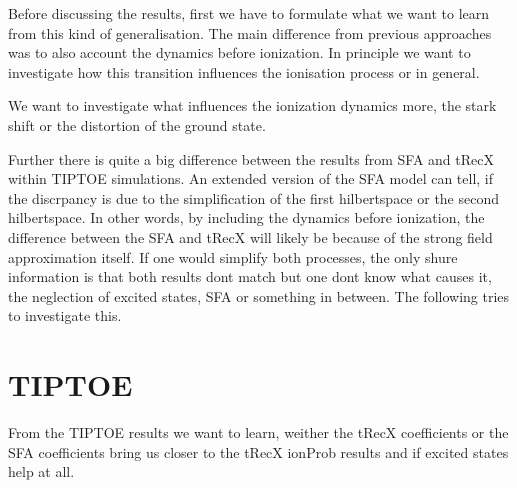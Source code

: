 Before discussing the results, first we have to formulate what we want to learn from this kind of generalisation. 
The main difference from previous approaches was to also account the dynamics before ionization.
In principle we want to investigate how this transition influences the ionisation process or in general.

We want to investigate what influences the ionization dynamics more, the stark shift or the distortion of the ground state.

Further there is quite a big difference between the results from SFA and tRecX within TIPTOE simulations. 
An extended version of the SFA model can tell, if the discrpancy is due to the simplification of the first hilbertspace or the second hilbertspace.
In other words, by including the dynamics before ionization, the difference between the SFA and tRecX will likely be because of the strong field approximation itself.
If one would simplify both processes, the only shure information is that both results dont match but one dont know what causes it, the neglection of excited states, SFA or something in between.
The following tries to investigate this.





\section{TIPTOE}
From the TIPTOE results we want to learn, weither the tRecX coefficients or the SFA coefficients bring us closer to the tRecX ionProb results and if excited states help at all.

